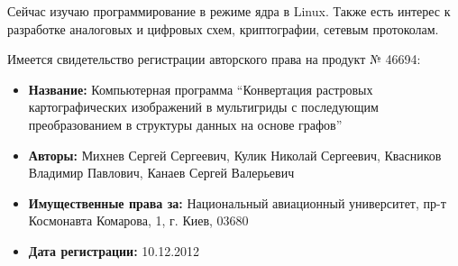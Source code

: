 \documentclass[11pt,a4paper,russian]{moderncv}
\begin{document}
\par{Сейчас изучаю программирование в режиме ядра в Linux. Также есть интерес к разработке аналоговых и цифровых схем, криптографии, сетевым протоколам.}
\par{Имеется свидетельство регистрации авторского права на продукт № 46694:}
\begin{itemize}
\item \textbf{Название:} Компьютерная программа ``Конвертация растровых картографических изображений в мультигриды с последующим преобразованием в структуры данных на основе графов''
\item \textbf{Авторы:} Михнев Сергей Сергеевич, Кулик Николай Сергеевич, Квасников Владимир Павлович, Канаев Сергей Валерьевич
\item \textbf{Имущественные права за:} Национальный авиационный университет, пр-т Космонавта Комарова, 1, г. Киев, 03680
\item \textbf{Дата регистрации:} 10.12.2012
\end{itemize}

\clearpage
\end{document}
